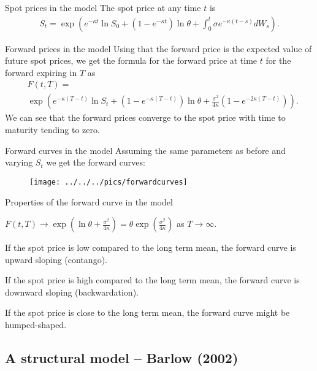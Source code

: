 {%

{Spot prices in the model}
The spot price at any time $t$ is
\begin{align*}
	S_t = \exp \left( e^{-\kappa t} \ln S_0 + (1-e^{-\kappa t}) \ln \theta + \int_0^t{\sigma e^{-\kappa (t-s)}}dW_s \right).
\end{align*}

{Forward prices in the model}
Using that the forward price is the expected value of future spot prices,
we get the formula for the forward price at time $t$ for the forward expiring in $T$ as
\begin{align*}
	&F(t,T) = \\
	&\exp \left( e^{-\kappa(T-t)} \ln S_t + (1-e^{-\kappa(T-t)}) \ln \theta + \frac{\sigma^2}{4\kappa}(1-e^{-2\kappa(T-t)}) \right).
\end{align*}
We can see that the forward prices converge to the spot price with time to maturity tending to zero.

{Forward curves in the model}
Assuming the same parameters as before and varying $S_t$ we get the forward curves:
\begin{figure}
	\centering
		\texttt{[image: ../../../pics/forwardcurves]}
	\label{fig:forwardcurves}
\end{figure}

{Properties of the forward curve in the model}






	$F(t,T) \rightarrow \exp(\ln \theta + \frac{\sigma^2}{4 \kappa}) = \theta \exp{(\frac{\sigma^2}{4\kappa})}$ as $T \rightarrow \infty$.


	If the spot price is low compared to the long term mean, the forward curve is upward sloping (contango).


	If the spot price is high compared to the long term mean, the forward curve is downward sloping (backwardation).


	If the spot price is close to the long term mean, the forward curve might be humped-shaped.





\subsection{A structural model -- Barlow (2002)}

}
